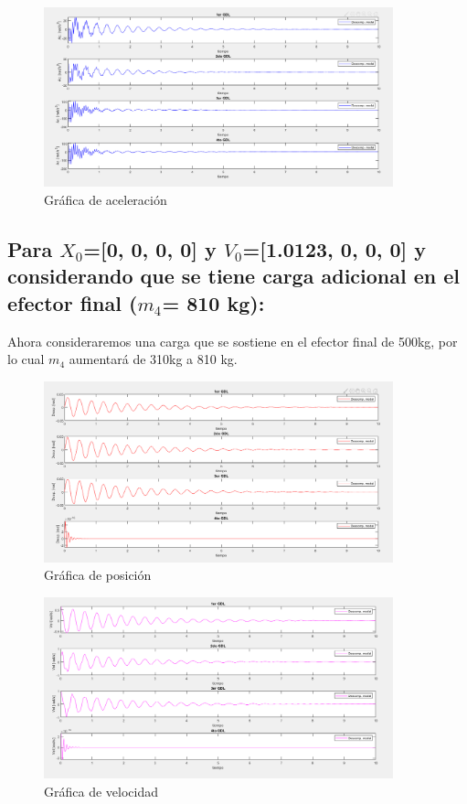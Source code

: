 \documentclass{aleph-revista}
\begin{document}
\begin{figure}[H]
    \centering
    \includegraphics[width=0.90\textwidth]{Imagenes/r15.png}
    \caption{Gráfica de aceleración}
    \label{fig:etiqueta de la figura}
\end{figure}


\subsection{Para $X_0$=[0, 0, 0, 0] y $V_0$=[1.0123, 0, 0, 0] y considerando que se tiene carga adicional en el efector final ($m_4$= 810 kg):}

Ahora consideraremos una carga que se sostiene en el efector final de 500kg, por lo cual $m_4$ aumentará de 310kg a 810 kg.


\begin{figure}[H]
    \centering
    \includegraphics[width=0.90\textwidth]{Imagenes/r16.png}
    \caption{Gráfica de posición}
    \label{fig:etiqueta de la figura}
\end{figure}

\begin{figure}[H]
    \centering
    \includegraphics[width=0.90\textwidth]{Imagenes/r17.png}
    \caption{Gráfica de velocidad}
    \label{fig:etiqueta de la figura}
\end{figure}
\end{document}
